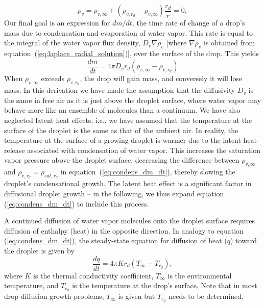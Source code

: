 \documentclass{report}
\begin{document}
\begin{equation}
    \rho_v = \rho_{v, \infty} + (\rho_{v, r_d} - \rho_{v, \infty}) \frac{r_{d}}{r} = 0, 
    \label{eq:laplace_radial_solution}
\end{equation}
Our final goal is an expression for $dm/dt$, the time rate of change of a drop's mass due to condensation and evaporation of water vapor. This rate is equal to the integral of the water vapor flux density, $D_v \nabla \rho_v$ [where $\nabla \rho_v$ is obtained from equation~(\ref{eq:laplace_radial_solution})], over the surface of the drop. This yields
\begin{equation}
    \frac{dm}{dt} = 4 \pi D_v r_d (\rho_{v, \infty} - \rho_{v, r_d}) 
    \label{eq:condens_dm_dt}
\end{equation}
When $\rho_{v, \infty}$ exceeds $\rho_{v, r_d}$, the drop will gain mass, and conversely it will lose mass. In this derivation we have made the assumption that the diffusivity $D_v$ is the same in free air as it is just above the droplet surface, where water vapor may behave more like an ensemble of molecules than a continuum. We have also neglected latent heat effects, i.e., we have assumed that the temperature at the surface of the droplet is the same as that of the ambient air. In reality, the temperature at the surface of a growing droplet is warmer due to the latent heat release associated with condensation of water vapor. This increases the saturation vapor pressure above the droplet surface, decreasing the difference between $\rho_{v, \infty}$ and $\rho_{v, r_d}=\rho_{sat, r_d}$ in equation~({\ref{eq:condens_dm_dt}}), thereby slowing the droplet's condensational growth. The latent heat effect is a significant factor in diffusional droplet growth -- in the following, we thus expand equation (\ref{eq:condens_dm_dt}) to include this process.

A continued diffusion of water vapor molecules onto the droplet surface requires diffusion of enthalpy (heat) in the opposite direction. In analogy to equation (\ref{eq:condens_dm_dt}), the steady-state equation for diffusion of heat ($q$) toward the droplet is given by
\begin{equation}
\frac{dq}{dt} = 4 \pi K r_d (T_{\infty} - T_{r_d}),
\label{eq:dq_dt}
\end{equation}
where $K$ is the thermal conductivity coefficient, $T_\infty$ is the environmental temperature, and $T_{r_d}$ is the temperature at the drop's surface. Note that in most drop diffusion growth problems, $T_\infty$ is given but $T_{r_d}$ needs to be determined.
\end{document}
